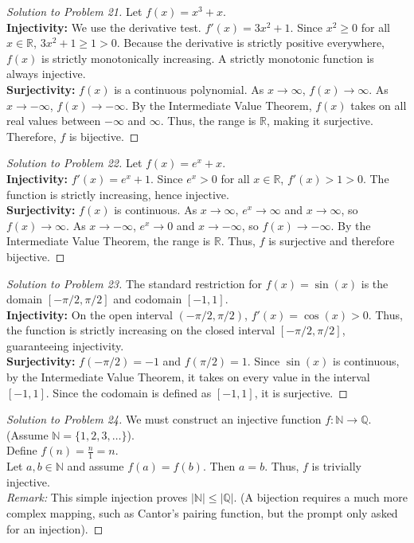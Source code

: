 \documentclass[11pt, letterpaper]{article}
\theoremstyle{definition}
\theoremstyle{remark}
\newcommand{\R}{\mathbb{R}}
\newcommand{\N}{\mathbb{N}}
\newcommand{\Q}{\mathbb{Q}}
\begin{document}
\begin{proof}[Solution to Problem 21]
Let $f(x) = x^3 + x$. \\
\textbf{Injectivity:} We use the derivative test. $f'(x) = 3x^2 + 1$. Since $x^2 \ge 0$ for all $x \in \R$, $3x^2 + 1 \ge 1 > 0$. Because the derivative is strictly positive everywhere, $f(x)$ is strictly monotonically increasing. A strictly monotonic function is always injective. \\
\textbf{Surjectivity:} $f(x)$ is a continuous polynomial. As $x \to \infty$, $f(x) \to \infty$. As $x \to -\infty$, $f(x) \to -\infty$. By the Intermediate Value Theorem, $f(x)$ takes on all real values between $-\infty$ and $\infty$. Thus, the range is $\R$, making it surjective. \\
Therefore, $f$ is bijective.
\end{proof}

\begin{proof}[Solution to Problem 22]
Let $f(x) = e^x + x$. \\
\textbf{Injectivity:} $f'(x) = e^x + 1$. Since $e^x > 0$ for all $x \in \R$, $f'(x) > 1 > 0$. The function is strictly increasing, hence injective. \\
\textbf{Surjectivity:} $f(x)$ is continuous. As $x \to \infty$, $e^x \to \infty$ and $x \to \infty$, so $f(x) \to \infty$. As $x \to -\infty$, $e^x \to 0$ and $x \to -\infty$, so $f(x) \to -\infty$. By the Intermediate Value Theorem, the range is $\R$. Thus, $f$ is surjective and therefore bijective.
\end{proof}

\begin{proof}[Solution to Problem 23]
The standard restriction for $f(x) = \sin(x)$ is the domain $[-\pi/2, \pi/2]$ and codomain $[-1, 1]$. \\
\textbf{Injectivity:} On the open interval $(-\pi/2, \pi/2)$, $f'(x) = \cos(x) > 0$. Thus, the function is strictly increasing on the closed interval $[-\pi/2, \pi/2]$, guaranteeing injectivity. \\
\textbf{Surjectivity:} $f(-\pi/2) = -1$ and $f(\pi/2) = 1$. Since $\sin(x)$ is continuous, by the Intermediate Value Theorem, it takes on every value in the interval $[-1, 1]$. Since the codomain is defined as $[-1, 1]$, it is surjective.
\end{proof}

\begin{proof}[Solution to Problem 24]
We must construct an injective function $f : \N \to \Q$. (Assume $\N = \{1, 2, 3, \dots\}$). \\
Define $f(n) = \frac{n}{1} = n$. \\
Let $a, b \in \N$ and assume $f(a) = f(b)$. Then $a = b$. Thus, $f$ is trivially injective. \\
\textit{Remark:} This simple injection proves $|\N| \le |\Q|$. (A bijection requires a much more complex mapping, such as Cantor's pairing function, but the prompt only asked for an injection).
\end{proof}
\end{document}
